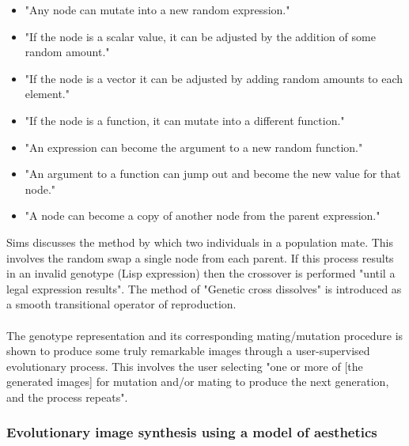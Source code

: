 \documentclass[10pt,a4paper]{article}
\begin{document}
\begin{itemize}
	\item "Any node can mutate into a new random expression."
	\item "If the node is a scalar value, it can be adjusted by the addition of some random amount."
	\item "If the node is a vector it can be adjusted by adding random amounts to each element."
	\item "If the node is a function, it can mutate into a different function."
	\item "An expression can become the argument to a new random function."
	\item "An argument to a function can jump out and become the new value for that node."
	\item "A node can become a copy of another node from the parent expression."
\end{itemize}

Sims discusses the method by which two individuals in a population mate.
This involves the random swap a single node from each parent.
If this process results in an invalid genotype (Lisp expression) then the crossover is performed "until a legal expression results".
The method of "Genetic cross dissolves" is introduced as a smooth transitional operator of reproduction.
\\\\
The genotype representation and its corresponding mating/mutation procedure is shown to produce some truly remarkable images through a user-supervised evolutionary process.
This involves the user selecting "one or more of [the generated images] for mutation and/or mating to produce the next generation, and the process repeats".

\subsubsection{Evolutionary image synthesis using a model of aesthetics \cite{aesthetic-measures}}
\end{document}
